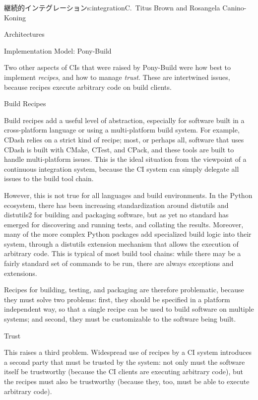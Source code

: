 \begin{aosachapter}{継続的インテグレーション}{s:integration}{C.\ Titus Brown and Rosangela Canino-Koning}
\begin{aosasect1}{Architectures}
\begin{aosasect2}{Implementation Model: Pony-Build}
\begin{aosadescription}
\end{aosadescription}

Two other aspects of CIs that were raised by Pony-Build were how best
to implement \emph{recipes}, and how to manage \emph{trust}. These are
intertwined issues, because recipes execute arbitrary code on build
clients.

\end{aosasect2}

\begin{aosasect2}{Build Recipes}

Build recipes add a useful level of abstraction, especially for
software built in a cross-platform language or using a multi-platform
build system. For example, CDash relies on a strict kind of
recipe; most, or perhaps all, software that uses CDash is built
with CMake, CTest, and CPack, and these tools are built to handle
multi-platform issues. This is the ideal situation from the viewpoint
of a continuous integration system, because the CI system can simply
delegate all issues to the build tool chain.

However, this is not true for all languages and build environments. In
the Python ecosystem, there has been increasing standardization around
distutils and distutils2 for building and packaging software, but as
yet no standard has emerged for discovering and running tests, and
collating the results. Moreover, many of the more complex Python
packages add specialized build logic into their system, through a
distutils extension mechanism that allows the execution of arbitrary
code. This is typical of most build tool chains: while there may be a
fairly standard set of commands to be run, there are always exceptions
and extensions.

Recipes for building, testing, and packaging are therefore
problematic, because they must solve two problems: first, they should
be specified in a platform independent way, so that a single recipe
can be used to build software on multiple systems; and second, they
must be customizable to the software being built.

\end{aosasect2}

\begin{aosasect2}{Trust}

This raises a third problem.  Widespread use of recipes by a CI system
introduces a second party that must be trusted by the system: not only
must the software itself be trustworthy (because the CI clients are
executing arbitrary code), but the recipes must also be trustworthy
(because they, too, must be able to execute arbitrary code).


\end{aosasect2}
\end{aosasect1}
\end{aosachapter}

